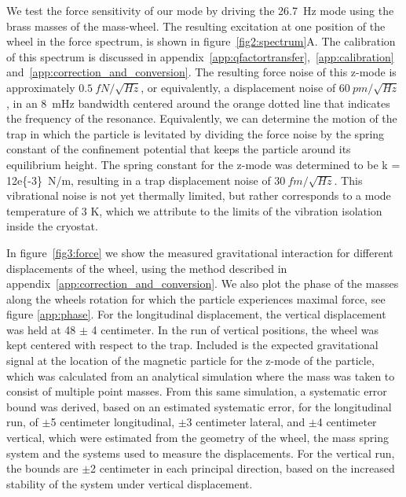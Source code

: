 We test the force sensitivity of our mode by driving the \SI{26.7}{Hz} mode using the brass masses of the mass-wheel. 
The resulting excitation at one position of the wheel in the force spectrum, is shown in figure~\ref{fig2:spectrum}A. 
The calibration of this spectrum is discussed in appendix~\ref{app:qfactortransfer},~\ref{app:calibration} and~\ref{app:correction_and_conversion}. 
The resulting force noise of this z-mode is approximately $\SI{0.5}{fN/\sqrt{Hz}}$,  or equivalently, a displacement noise of $\SI{60}{pm/\sqrt{Hz}}$, in an \SI{8}{mHz} bandwidth centered around the orange dotted line that indicates the frequency of the resonance. 
Equivalently, we can determine the motion of the trap in which the particle is levitated by dividing the force noise by the spring constant of the confinement potential that keeps the particle around its equilibrium height. 
The spring constant for the z-mode was determined to be k = \SI{12e{-3}}{N/m}, resulting in a trap displacement noise of $\SI{30}{fm/\sqrt{Hz}}$.
This vibrational noise is not yet thermally limited, but rather corresponds to a mode temperature of 3 K, which we attribute to the limits of the vibration isolation inside the cryostat.

In figure~\ref{fig3:force} we show the measured gravitational interaction for different displacements of the wheel, using the method described in appendix~\ref{app:correction_and_conversion}. We also plot the phase of the masses along the wheels rotation for which the particle experiences maximal force, see figure \ref{app:phase}. For the longitudinal displacement, the vertical displacement was held at \SI{48}{} $\pm$ \SI{4}{} centimeter. In the run of vertical positions, the wheel was kept centered with respect to the trap. Included is the expected gravitational signal at the location of the magnetic particle for the z-mode of the particle, which was calculated from an analytical simulation where the mass was taken to consist of multiple point masses. From this same simulation, a systematic error bound was derived, based on an estimated systematic error, for the longitudinal run, of $\pm$5 centimeter longitudinal, $\pm$3 centimeter lateral, and $\pm$4 centimeter vertical, which were estimated from the geometry of the wheel, the mass spring system and the systems used to measure the displacements. For the vertical run, the bounds are $\pm$2 centimeter in each principal direction, based on the increased stability of the system under vertical displacement.

